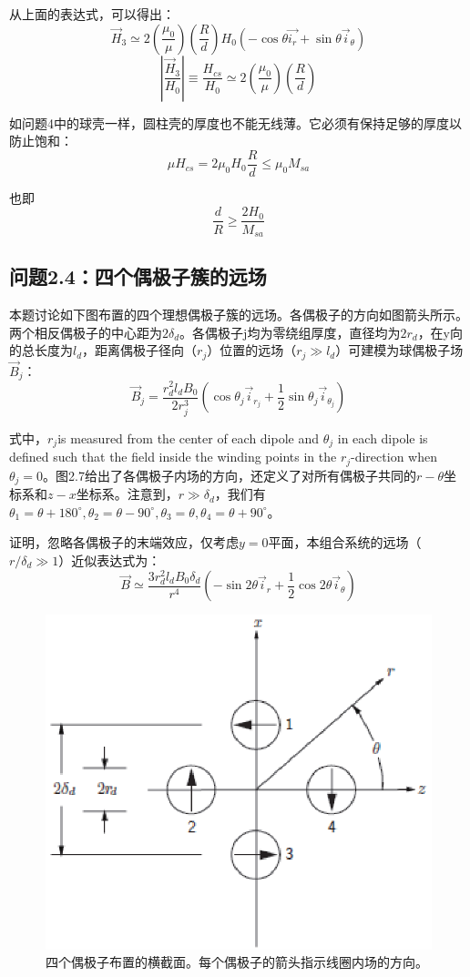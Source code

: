 从上面的表达式，可以得出：
$$\vec{H}_3 \simeq 2(\frac{\mu_0}{\mu}) (\frac{R}{d})H_0 (-\cos\theta \vec{i_r}+\sin\theta\vec{i}_\theta)$$
$$\left|\frac{\vec{H}_3}{H_0}\right|\equiv\frac{H_{cs}}{H_0}\simeq 2(\frac{\mu_0}{\mu}) (\frac{R}{d})$$

如问题4中的球壳一样，圆柱壳的厚度也不能无线薄。它必须有保持足够的厚度以防止饱和：
$$\mu H_{cs}=2\mu_0 H_0 \frac{R}{d}\le \mu_0 M_{sa}$$

也即
$$\frac{d}{R}\ge \frac{2H_0}{M_{sa}}$$


\subsection{问题2.4：四个偶极子簇的远场}
本题讨论如下图布置的四个理想偶极子簇的远场。各偶极子的方向如图箭头所示。两个相反偶极子的中心距为$2\delta_d$。各偶极子j均为零绕组厚度，直径均为$2r_d$，在y向的总长度为$l_d$，距离偶极子径向（$r_j$）位置的远场（$r_j \gg l_d$）可建模为球偶极子场$\vec{B}_j$：
$$\vec{B}_j=\frac{r_d^2 l_d B_0}{2r_j^3}(\cos\theta_j \vec{i}_{r_j}+\frac{1}{2} \sin\theta_j \vec{i}_{\theta_j})$$

式中，$r_j$is measured from the center of each dipole and $\theta_j$ in each dipole is defined such that the field inside the winding points in the $r_j$-direction when $\theta_j=0$。图2.7给出了各偶极子内场的方向，还定义了对所有偶极子共同的$r-\theta$坐标系和$z-x$坐标系。注意到，$r\gg \delta_d$，我们有$\mathscr{\theta}_1=\theta+180^\circ,\theta_2=\theta-90^\circ,\theta_3=\theta,\theta_4=\theta + 90^\circ$。

证明，忽略各偶极子的末端效应，仅考虑$y=0$平面，本组合系统的远场（$r/\delta_d \gg 1$）近似表达式为：
$$ \vec{B}\simeq \frac{3r_d^2 l_d B_0 \delta_d}{r^4}(-\sin 2\theta \vec{i}_r+\frac{1}{2}\cos 2\theta \vec{i}_\theta)$$

\begin{figure}
  \centering
 \includegraphics[scale=0.8]{chpt2/figs/fig2.7.eps}
  \caption{四个偶极子布置的横截面。每个偶极子的箭头指示线圈内场的方向。}
\end{figure}



